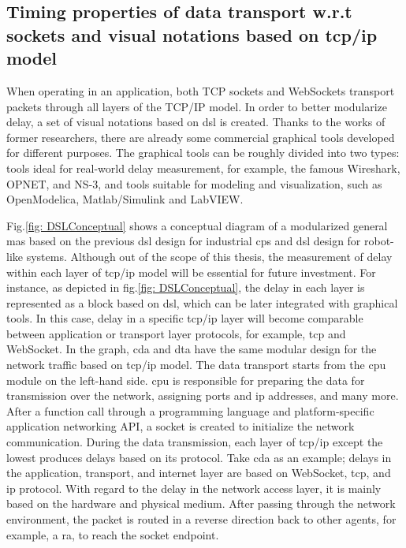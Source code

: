 \subsection{Timing properties of data transport w.r.t sockets and visual notations based on \gls{tcp/ip} model}
When operating in an application, both TCP sockets and WebSockets transport packets 
through all layers of the TCP/IP model. In order to better modularize delay, a set of 
visual notations based on \gls{dsl} is created.
Thanks to the works of former researchers, there are already some commercial graphical tools 
developed for different purposes. The graphical tools 
can be roughly divided into two types: tools ideal for real-world delay measurement, 
for example, the famous Wireshark, OPNET, and NS-3, 
and tools suitable for modeling and visualization, such as OpenModelica, 
Matlab/Simulink and LabVIEW.


Fig.\ref{fig: DSLConceptual} shows a conceptual diagram of a modularized 
general \gls{mas} based on the previous \gls{dsl} design \cite{hujo_toward_2022} 
for industrial \gls{cps} and \gls{dsl} design for robot-like 
systems\cite{volpert_supporting_nodate}. 
Although out of the scope of this thesis, the measurement of delay within 
each layer of \gls{tcp/ip} model will be essential for future investment.
For instance, as depicted in fig.\ref{fig: DSLConceptual}, the delay in 
each layer is represented as a block based on \gls{dsl}, which can be later integrated 
with graphical tools.
In this case, delay in a specific \gls{tcp/ip} layer will become comparable between 
application or transport layer protocols, for example, 
\gls{tcp} and WebSocket. In the graph, \gls{cda} and \gls{dta} 
have the same modular design for the network traffic based on \gls{tcp/ip} 
model. The data transport starts from the \gls{cpu} module on the left-hand side. 
\gls{cpu} is responsible for preparing the data for transmission over the network, 
assigning ports and \gls{ip} addresses, and many more. After a function call 
through a programming language and platform-specific application 
networking API, a socket is created to initialize the network communication. 
During the data transmission, each layer of \gls{tcp/ip} except the lowest 
produces delays 
based on its protocol. Take \gls{cda} as an example; delays in the application, 
transport, and internet layer are based on WebSocket, \gls{tcp}, and 
\gls{ip} protocol. With regard to the delay in the network access layer, it is mainly 
based on the hardware and physical medium. After passing through the network 
environment, the packet is routed in a reverse direction back to other agents, 
for example, a \gls{ra}, to reach the socket endpoint.  



